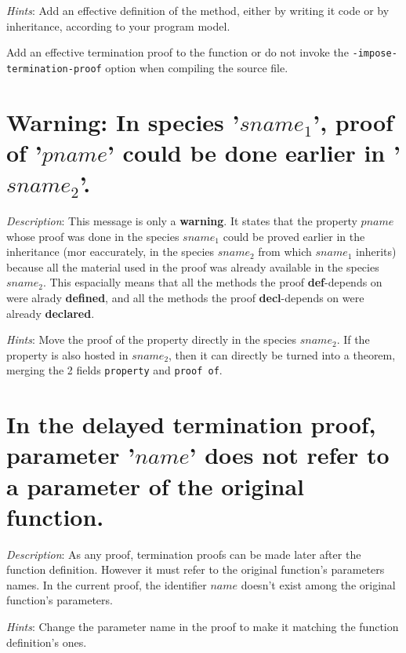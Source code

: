 {\em Hints}: Add an effective definition of the method, either by
writing it code or by inheritance, according to your program model.

Add an effective termination proof to the function or do
not invoke the {\tt -impose-termination-proof} option when compiling
the source file.



\section*{Warning: In species '$sname_1$', proof of '$pname$' could be done
  earlier in '$sname_2$'.}

{\em Description}: This message is only a {\bf warning}. It states
that the property $pname$ whose proof was done in the species
$sname_1$ could be proved earlier in the inheritance (mor eaccurately,
in the species $sname_2$ from which $sname_1$ inherits) because all
the material used in the proof was already available in the species
$sname_2$. This espacially means that all the methods the proof
{\bf def}-depends on were alrady {\bf defined}, and all the methods
the proof {\bf decl}-depends on were already {\bf declared}.

{\em Hints}: Move the proof of the property directly in the species
$sname_2$. If the property is also hosted in $sname_2$, then it can
directly be turned into a theorem, merging the 2 fields {\tt property}
and {\tt proof of}.



\section*{In the delayed termination proof, parameter '$name$' does
  not refer to a parameter of the original function.}

{\em Description}: As any proof, termination proofs can be made later
after the function definition. However it must refer to the original
function's parameters names. In the current proof, the identifier
$name$ doesn't exist among the original function's parameters.

{\em Hints}: Change the parameter name in the proof to make it
matching the function definition's ones.




